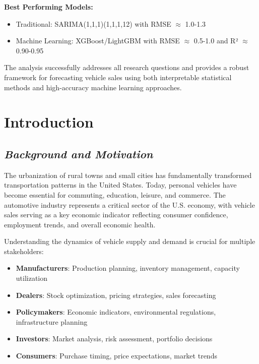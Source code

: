 \documentclass[12pt]{article}
\begin{document}
\textbf{Best Performing Models:}
\begin{itemize}
    \item Traditional: SARIMA(1,1,1)(1,1,1,12) with RMSE $\approx$ 1.0-1.3
    \item Machine Learning: XGBoost/LightGBM with RMSE $\approx$ 0.5-1.0 and R² $\approx$ 0.90-0.95
\end{itemize}

The analysis successfully addresses all research questions and provides a robust framework for forecasting vehicle sales using both interpretable statistical methods and high-accuracy machine learning approaches.

\section*{\textbf{Introduction}}

\subsection*{\textit{Background and Motivation}}

The urbanization of rural towns and small cities has fundamentally transformed transportation patterns in the United States. Today, personal vehicles have become essential for commuting, education, leisure, and commerce. The automotive industry represents a critical sector of the U.S. economy, with vehicle sales serving as a key economic indicator reflecting consumer confidence, employment trends, and overall economic health.

Understanding the dynamics of vehicle supply and demand is crucial for multiple stakeholders:
\begin{itemize}
    \item \textbf{Manufacturers}: Production planning, inventory management, capacity utilization
    \item \textbf{Dealers}: Stock optimization, pricing strategies, sales forecasting
    \item \textbf{Policymakers}: Economic indicators, environmental regulations, infrastructure planning
    \item \textbf{Investors}: Market analysis, risk assessment, portfolio decisions
    \item \textbf{Consumers}: Purchase timing, price expectations, market trends
\end{itemize}
\end{document}
